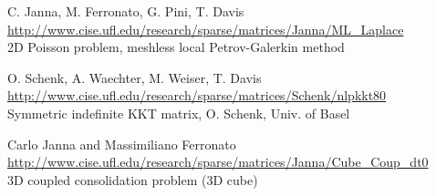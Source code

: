 	{
		{
			C. Janna, M. Ferronato, G. Pini,  T. Davis
		}
		{
			\url{http://www.cise.ufl.edu/research/sparse/matrices/Janna/ML_Laplace} \\
			2D Poisson problem, meshless local Petrov-Galerkin method
		}
	} 

	{
		{
			O. Schenk, A. Waechter, M. Weiser, T. Davis	
		}
		{
			\url{http://www.cise.ufl.edu/research/sparse/matrices/Schenk/nlpkkt80} \\
			Symmetric indefinite KKT matrix, O. Schenk, Univ. of Basel
		}
	} 

	{
		{
			Carlo Janna and Massimiliano Ferronato
		}
		{
			\url{http://www.cise.ufl.edu/research/sparse/matrices/Janna/Cube_Coup_dt0} \\
			3D coupled consolidation problem (3D cube)
		}
	} 